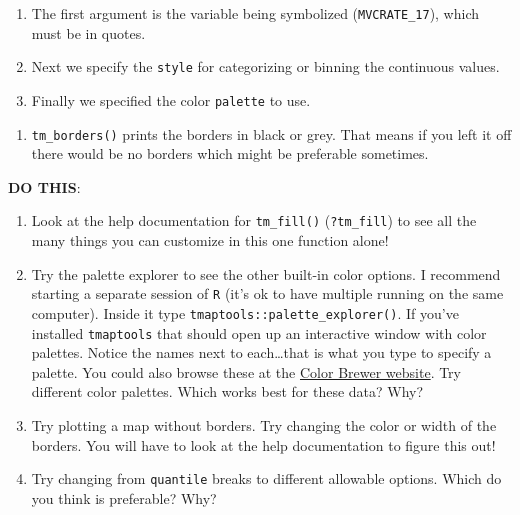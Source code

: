 \documentclass[
]{book}
\providecommand{\tightlist}{%
  \setlength{\itemsep}{0pt}\setlength{\parskip}{0pt}}
\newenvironment{rmdnote}[1]
  {
  \begin{itemize}
  \renewcommand{\labelitemi}{
    \raisebox{-.7\height}[0pt][0pt]{
      {\setkeys{Gin}{width=3em,keepaspectratio}\texttt{[image: images/\#1]}}
    }
  }
  \setlength{\fboxsep}{1em}
  \begin{note}
  \item
  }
  {
  \end{note}
  \end{itemize}
  }
\begin{document}
\begin{enumerate}
\def\labelenumi{\alph{enumi}.}
\tightlist
\item
  The first argument is the variable being symbolized (\texttt{MVCRATE\_17}), which must be in quotes.
\item
  Next we specify the \texttt{style} for categorizing or binning the continuous values.
\item
  Finally we specified the color \texttt{palette} to use.
\end{enumerate}

\begin{enumerate}
\def\labelenumi{\arabic{enumi}.}
\setcounter{enumi}{2}
\tightlist
\item
  \texttt{tm\_borders()} prints the borders in black or grey. That means if you left it off there would be no borders which might be preferable sometimes.
\end{enumerate}

\begin{rmdnote}{note}

\textbf{DO THIS}:

\begin{enumerate}
\def\labelenumi{\arabic{enumi}.}
\tightlist
\item
  Look at the help documentation for \texttt{tm\_fill()} (\texttt{?tm\_fill}) to see all the many things you can customize in this one function alone!
\item
  Try the palette explorer to see the other built-in color options. I recommend starting a separate session of \texttt{R} (it's ok to have multiple running on the same computer). Inside it type \texttt{tmaptools::palette\_explorer()}. If you've installed \texttt{tmaptools} that should open up an interactive window with color palettes. Notice the names next to each\ldots that is what you type to specify a palette. You could also browse these at the \href{https://colorbrewer2.org/\#type=sequential\&scheme=BuGn\&n=3}{Color Brewer website}. Try different color palettes. Which works best for these data? Why?
\item
  Try plotting a map without borders. Try changing the color or width of the borders. You will have to look at the help documentation to figure this out!
\item
  Try changing from \texttt{quantile} breaks to different allowable options. Which do you think is preferable? Why?
\end{enumerate}

\end{rmdnote}
\end{document}
